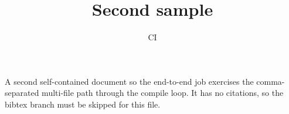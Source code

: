 \documentclass{article}
\title{Second sample}
\author{CI}
\begin{document}
\maketitle
A second self-contained document so the end-to-end job exercises the
comma-separated multi-file path through the compile loop. It has no
citations, so the bibtex branch must be skipped for this file.
\end{document}
